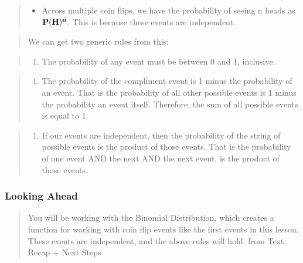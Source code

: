 \documentclass[]{book}
\providecommand{\tightlist}{%
  \setlength{\itemsep}{0pt}\setlength{\parskip}{0pt}}
\begin{document}
\begin{quote}
\begin{itemize}
\tightlist
\item
  Across multiple coin flips, we have the probability of seeing n heads
  as \(\bold{P(H)^n}\). This is because these events are independent.
\end{itemize}
\end{quote}

\begin{quote}
We can get two generic rules from this:
\end{quote}

\begin{quote}
\begin{enumerate}
\def\labelenumi{\arabic{enumi}.}
\tightlist
\item
  The probability of any event must be between 0 and 1, inclusive.
\end{enumerate}
\end{quote}

\begin{quote}
\begin{enumerate}
\def\labelenumi{\arabic{enumi}.}
\setcounter{enumi}{1}
\tightlist
\item
  The probability of the compliment event is 1 minus the probability of
  an event. That is the probability of all other possible events is 1
  minus the probability an event itself. Therefore, the sum of all
  possible events is equal to 1.
\end{enumerate}
\end{quote}

\begin{quote}
\begin{enumerate}
\def\labelenumi{\arabic{enumi}.}
\setcounter{enumi}{2}
\tightlist
\item
  If our events are independent, then the probability of the string of
  possible events is the product of those events. That is the
  probability of one event AND the next AND the next event, is the
  product of those events.
\end{enumerate}
\end{quote}

\subsubsection{Looking Ahead}\label{looking-ahead}

\begin{quote}
You will be working with the Binomial Distribution, which creates a
function for working with coin flip events like the first events in this
lesson. These events are independent, and the above rules will hold.
from Text: Recap + Next Steps
\end{quote}
\end{document}
